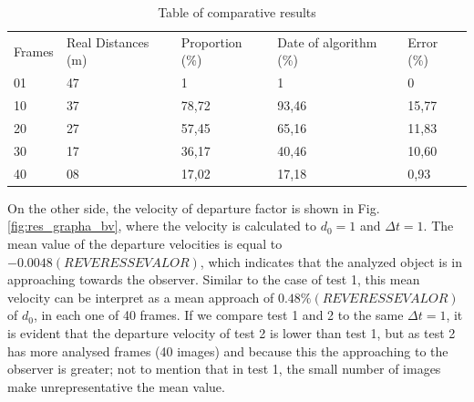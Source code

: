\begin{table}[H]
\setlength{\tabcolsep}{1 pt} 
\caption{Table of comparative results}
\begin{tabular}{lllll}
Frames & Real Distances (m) & Proportion (\%) & Date of algorithm (\%) & Error (\%)\\
01 & 47 & 1 & 1 & 0 \\
10 & 37 & 78,72 & 93,46 & 15,77 \\
20 & 27 & 57,45 & 65,16 & 11,83 \\
30 & 17 & 36,17 & 40,46 & 10,60 \\
40 & 08 & 17,02 & 17,18 & 0,93
\end{tabular}
\end{table}

On the other side, the velocity of departure factor is shown in 
Fig. \ref{fig:res_grapha_bv}, where the velocity is calculated
to $d_0=1$ and $\Delta t=1$. The mean value of the departure
velocities is equal to $-0.0048 (REVER ESSE VALOR)$, which indicates that the
analyzed object is in approaching towards the observer. Similar
to the case of test 1, this mean velocity can be interpret
as a mean approach of $0.48\% (REVER ESSE VALOR)$ of $d_0$, in each one of 40 frames.
If we compare test 1 and 2 to the same $\Delta t=1$, it is evident 
that the departure velocity of  test 2  is lower than  test 1, 
but as  test 2 has more analysed frames (40 images)
and because this the approaching to the observer is greater; 
not to mention that in test 1, the small number of images 
make  unrepresentative the mean value. 

